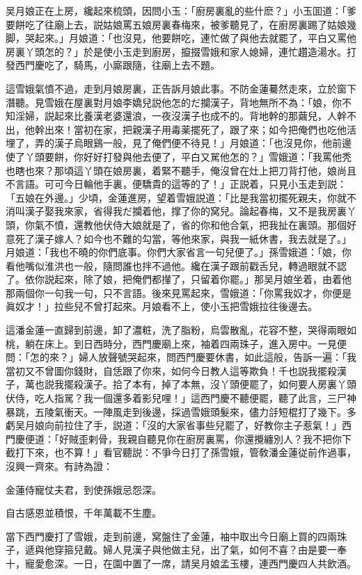 吴月娘正在上房，纔起來梳頭，因問小玉：「廚房裏亂的些什麽？」小玉囬道：「爹要餅吃了往廟上去，説姑娘罵五娘房裏春梅來，被爹聽見了，在廚房裏踢了姑娘幾脚，哭起來。」月娘道：「也沒見，他要餅吃，連忙做了與他去就罷了，平白又罵他房裏丫頭怎的？」於是使小玉走到廚房，攛掇雪娥和家人媳婦，連忙趲造湯水。打發西門慶吃了，騎馬，小廝跟隨，往廟上去不題。

這雪娥氣憤不過，走到月娘房裏，正告訴月娘此事。不防金蓮驀然走來，立於窗下潛聽。見雪娥在屋裏對月娘李嬌兒説他怎的だ攔漢子，背地無所不為：「娘，你不知淫婦，説起來比養漢老婆還浪，一夜沒漢子也成不的。背地幹的那繭兒，人幹不出，他幹出來！當初在家，把親漢子用毒薬擺死了，跟了來；如今把俺們也吃他活埋了，弄的漢子烏眼鷄一般，見了俺們便不待見！」月娘道：「也沒見你，他前邊使了丫頭要餅，你好好打發與他去便了，平白又駡他怎的？」雪娥道：「我罵他秃也瞎也來？那頃這丫頭在娘房裏，着緊不聽手，俺沒曾在灶上把刀背打他，娘尚且不言語。可可今日輪他手裏，便驕貴的這等的了！」正説着，只見小玉走到説：「五娘在外邊。」少頃，金蓮進房，望着雪娥説道：「比是我當初擺死親夫，你就不消叫漢子娶我來家，省得我だ攔着他，撑了你的窝兒。論起春梅，又不是我房裏丫頭，你氣不憤，還教他伏侍大娘就是了，省的你和他合氣，把我扯在裏頭。那個好意死了漢子嫁人？如今也不難的勾當，等他來家，與我一紙休書，我去就是了。」月娘道：「我也不曉的你們底事。你們大家省言一句兒便了。」孫雪娥道：「娘，你看他嘴似淮洪也一般，隨問誰也拌不過他。纔在漢子跟前戳舌兒，轉過眼就不認了。依你説起來，除了娘，把俺們都攆了，只留着你罷。」那吴月娘坐着，由着他那兩個你一句我一句，只不言語。後來見罵起來，雪娥道：「你罵我奴才，你便是眞奴才！」拉些兒不曾打起來。月娘看不上，使小玉把雪娥拉往後邊去。

這潘金蓮一直歸到前邊，卸了濃粧，洗了脂粉，烏雲散亂，花容不整，哭得兩眼如桃，躺在床上。到日西時分，西門慶廟上來，袖着四兩珠子，進入房中。一見便問：「怎的來？」婦人放聲號哭起來，問西門慶要休書，如此這般，告訴一遍：「我當初又不曾圖你錢財，自恁跟了你來，如何今日教人這等欺負！千也説我擺殺漢子，萬也説我擺殺漢子。拾了本有，掉了本無，沒丫頭便罷了，如何要人房裏丫頭伏侍，吃人指駡？我一個還多着影兒哩！」這西門慶不聽便罷，聽了此言，三尸神暴跳，五陵氣衝天。一陣風走到後邊，採過雪娥頭髮來，儘力㧱短棍打了幾下。多虧吴月娘向前拉住了手，説道：「沒的大家省事些兒罷了，好教你主子惹氣！」西門慶便道：「好賊歪剌骨，我親自聽見你在廚房裏罵，你還攪纏別人？我不把你下截打下來，也不算！」看官聽説：不爭今日打了孫雪娥，管敎潘金蓮従前作過事，沒興一齊來。有詩為證：

金蓮侍寵仗夫君，到使孫娥忌怨深。

自古感恩並積恨，千年萬載不生塵。

當下西門慶打了雪娥，走到前邊，窝盤住了金蓮，袖中取出今日廟上買的四兩珠子，遞與他穿箍兒戴。婦人見漢子與他做主兒，出了氣，如何不喜？由是要一奉十，寵愛愈深。一日，在園中置了一席，請吴月娘孟玉樓，連西門慶四人共飲酒。

